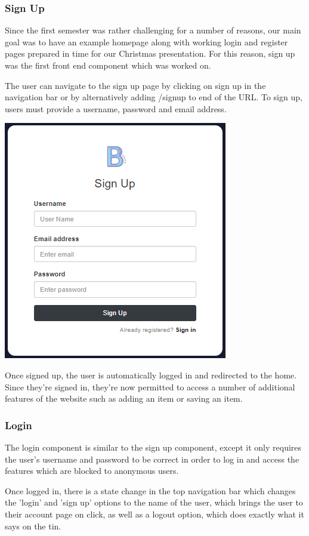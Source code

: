 \subsubsection{Sign Up}
Since the first semester was rather challenging for a number of reasons, our main goal was to have an example homepage along with working login and register pages prepared in time for our Christmas presentation. For this reason, sign up was the first front end component which was worked on. \par
The user can navigate to the sign up page by clicking on sign up in the navigation bar or by alternatively adding /signup to end of the URL. To sign up, users must provide a username, password and email address. 
\par
\includegraphics{img/fe_signup.png}
\par
Once signed up, the user is automatically logged in and redirected to the home. Since they're signed in, they're now permitted to access a number of additional features of the website such as adding an item or saving an item.  

\subsubsection{Login}
The login component is similar to the sign up component, except it only requires the user's username and password to be correct in order to log in and access the features which are blocked to anonymous users. 

Once logged in, there is a state change in the top navigation bar which changes the 'login' and 'sign up' options to the name of the user, which brings the user to their account page on click, as well as a logout option, which does exactly what it says on the tin.

